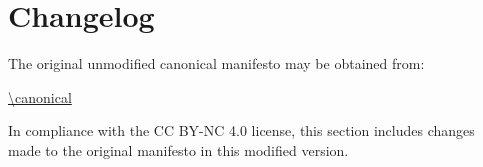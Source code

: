 \section{Changelog}

The original unmodified canonical manifesto may be obtained from:

\bigskip

\url{\canonical}

\bigskip

\noindent In compliance with the CC BY-NC 4.0 license, this section includes changes made to the original manifesto in this modified version.

